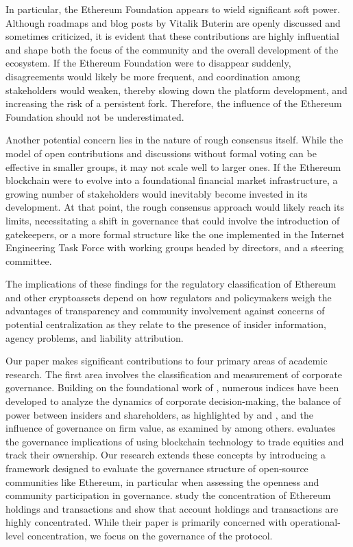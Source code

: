 \documentclass[No]{AEA}
\begin{document}
In particular, the Ethereum Foundation appears to wield significant soft power. Although roadmaps and blog posts by Vitalik Buterin are openly discussed and sometimes criticized, it is evident that these contributions are highly influential and shape both the focus of the community and the overall development of the ecosystem. If the Ethereum Foundation were to disappear suddenly, disagreements would likely be more frequent, and coordination among stakeholders would weaken, thereby slowing down the platform development, and increasing the risk of a persistent fork. Therefore, the influence of the Ethereum Foundation should not be underestimated.

Another potential concern lies in the nature of rough consensus itself. While the model of open contributions and discussions without formal voting can be effective in smaller groups, it may not scale well to larger ones. If the Ethereum blockchain were to evolve into a foundational financial market infrastructure, a growing number of stakeholders would inevitably become invested in its development. At that point, the rough consensus approach would likely reach its limits, necessitating a shift in governance that could involve the introduction of gatekeepers, or a more formal structure like the one implemented in the Internet Engineering Task Force with working groups headed by directors, and a steering committee.

The implications of these findings for the regulatory classification of Ethereum and other cryptoassets depend on how regulators and policymakers weigh the advantages of transparency and community involvement against concerns of potential centralization as they relate to the presence of insider information, agency problems, and liability attribution.

Our paper makes significant contributions to four primary areas of academic research. The first area involves the classification and measurement of corporate governance. Building on the foundational work of \cite{Gompers_Ishii2003}, numerous indices have been developed to analyze the dynamics of corporate decision-making, the balance of power between insiders and shareholders, as highlighted by \cite{JensenMeckling1976} and \cite{Bebchuketal2009}, and the influence of governance on firm value, as examined by \cite{Coreetal2006} among others. \cite{yermack2017corporate} evaluates the governance implications of using blockchain technology to trade equities and track their ownership. Our research extends these concepts by introducing a framework designed to evaluate the governance structure of open-source communities like Ethereum, in particular when assessing the openness and community participation in governance. \cite{cong2022inclusion} study the concentration of Ethereum holdings and transactions and show that account holdings and transactions are highly concentrated. While their paper is primarily concerned with operational-level concentration, we focus on the governance of the protocol.
\end{document}
